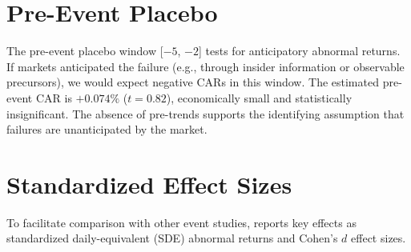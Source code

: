 \documentclass[12pt]{article}
\begin{document}
\section{Pre-Event Placebo}\label{app:placebo}

The pre-event placebo window [$-5$, $-2$] tests for anticipatory abnormal returns. If markets anticipated the failure (e.g., through insider information or observable precursors), we would expect negative CARs in this window. The estimated pre-event CAR is $+0.074\%$ ($t = 0.82$), economically small and statistically insignificant. The absence of pre-trends supports the identifying assumption that failures are unanticipated by the market.

\section{Standardized Effect Sizes}\label{app:sde}

To facilitate comparison with other event studies,  reports key effects as standardized daily-equivalent (SDE) abnormal returns and Cohen's $d$ effect sizes.
\end{document}
